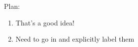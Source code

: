 Plan:
\begin{enumerate}
\item That's a good idea!
\item Need to go in and explicitly label them
\end{enumerate}
